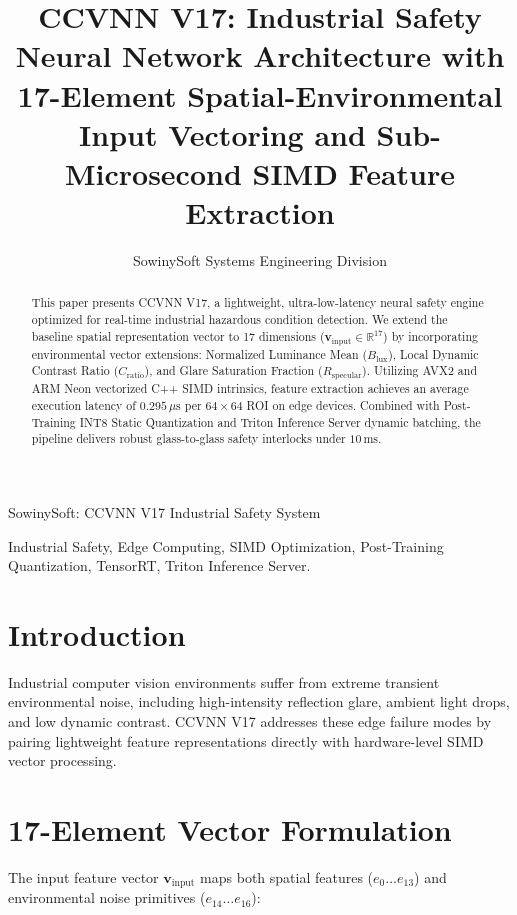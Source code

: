 \documentclass[10pt,journal,compsoc]{IEEEtran}
\begin{document}
\title{CCVNN V17: Industrial Safety Neural Network Architecture with 17-Element Spatial-Environmental Input Vectoring and Sub-Microsecond SIMD Feature Extraction}

\author{SowinySoft Systems Engineering Division}

%
{SowinySoft: CCVNN V17 Industrial Safety System}

\maketitle

\begin{abstract}
This paper presents CCVNN V17, a lightweight, ultra-low-latency neural safety engine optimized for real-time industrial hazardous condition detection. We extend the baseline spatial representation vector to 17 dimensions ($\mathbf{v}_{\text{input}} \in \mathbb{R}^{17}$) by incorporating environmental vector extensions: Normalized Luminance Mean ($B_{\text{lux}}$), Local Dynamic Contrast Ratio ($C_{\text{ratio}}$), and Glare Saturation Fraction ($R_{\text{specular}}$). Utilizing AVX2 and ARM Neon vectorized C++ SIMD intrinsics, feature extraction achieves an average execution latency of $0.295\,\mu\text{s}$ per $64\times 64$ ROI on edge devices. Combined with Post-Training INT8 Static Quantization and Triton Inference Server dynamic batching, the pipeline delivers robust glass-to-glass safety interlocks under $10\,\text{ms}$.
\end{abstract}

\begin{IEEEkeywords}
Industrial Safety, Edge Computing, SIMD Optimization, Post-Training Quantization, TensorRT, Triton Inference Server.
\end{IEEEkeywords}

\section{Introduction}
Industrial computer vision environments suffer from extreme transient environmental noise, including high-intensity reflection glare, ambient light drops, and low dynamic contrast. CCVNN V17 addresses these edge failure modes by pairing lightweight feature representations directly with hardware-level SIMD vector processing.

\section{17-Element Vector Formulation}
The input feature vector $\mathbf{v}_{\text{input}}$ maps both spatial features ($e_0 \dots e_{13}$) and environmental noise primitives ($e_{14} \dots e_{16}$):
\end{document}

